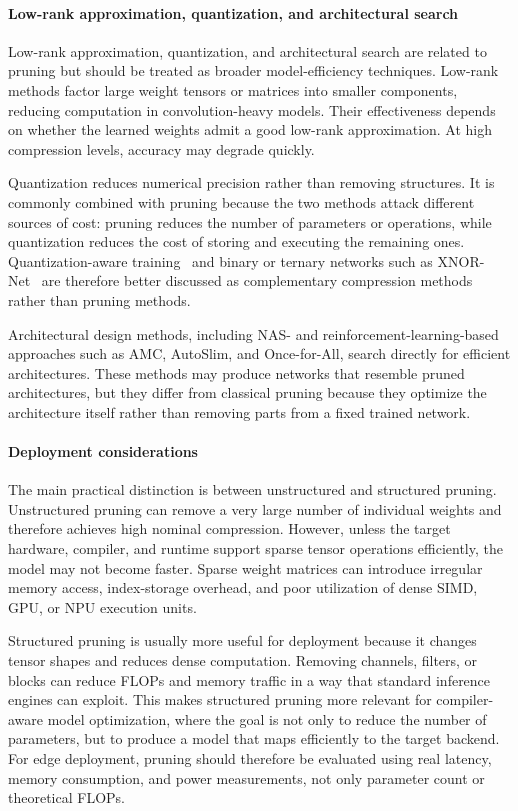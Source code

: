 \documentclass[12pt,a4paper]{report}
\begin{document}
\paragraph{Low-rank approximation, quantization, and architectural search}
Low-rank approximation, quantization, and architectural search are related to pruning but should
be treated as broader model-efficiency techniques. Low-rank methods factor large weight tensors
or matrices into smaller components, reducing computation in convolution-heavy models. Their
effectiveness depends on whether the learned weights admit a good low-rank approximation.
At high compression levels, accuracy may degrade quickly.

Quantization reduces numerical precision rather than removing structures. It is commonly
combined with pruning because the two methods attack different sources of cost: pruning reduces
the number of parameters or operations, while quantization reduces the cost of storing and
executing the remaining ones. Quantization-aware training~\cite{jacob2018quantization} and binary
or ternary networks such as XNOR-Net~\cite{rastegari2016xnor} are therefore better discussed as
complementary compression methods rather than pruning methods.

Architectural design methods, including NAS- and reinforcement-learning-based approaches such
as AMC, AutoSlim, and Once-for-All, search directly for efficient architectures. These methods may
produce networks that resemble pruned architectures, but they differ from classical pruning
because they optimize the architecture itself rather than removing parts from a fixed trained
network.

\paragraph{Deployment considerations}
The main practical distinction is between unstructured and structured pruning. Unstructured
pruning can remove a very large number of individual weights and therefore achieves high nominal
compression. However, unless the target hardware, compiler, and runtime support sparse tensor
operations efficiently, the model may not become faster. Sparse weight matrices can introduce
irregular memory access, index-storage overhead, and poor utilization of dense SIMD, GPU, or
NPU execution units.

Structured pruning is usually more useful for deployment because it changes tensor shapes and
reduces dense computation. Removing channels, filters, or blocks can reduce FLOPs and memory
traffic in a way that standard inference engines can exploit. This makes structured pruning more
relevant for compiler-aware model optimization, where the goal is not only to reduce the number
of parameters, but to produce a model that maps efficiently to the target backend. For edge
deployment, pruning should therefore be evaluated using real latency, memory consumption, and
power measurements, not only parameter count or theoretical FLOPs.
\end{document}
